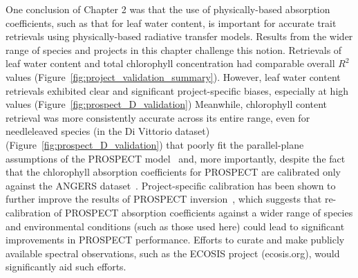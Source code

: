One conclusion of Chapter 2 was that the use of physically-based absorption coefficients, such as that for leaf water content, is important for accurate trait retrievals using physically-based radiative transfer models.
Results from the wider range of species and projects in this chapter challenge this notion.
Retrievals of leaf water content and total chlorophyll concentration had comparable overall $R^2$ values (Figure~\ref{fig:project_validation_summary}).
However, leaf water content retrievals exhibited clear and significant project-specific biases, especially at high values (Figure~\ref{fig:prospect_D_validation})
Meanwhile, chlorophyll content retrieval was more consistently accurate across its entire range, even for needleleaved species (in the Di Vittorio dataset) (Figure~\ref{fig:prospect_D_validation}) that poorly fit the parallel-plane assumptions of the PROSPECT model~\cite{allen_1969_interaction,jacquemoud1990_prospect} and, more importantly, despite the fact that the chlorophyll absorption coefficients for PROSPECT are calibrated only against the ANGERS dataset~\cite{feret2008_prospect,feret2017_prospectd}.
Project-specific calibration has been shown to further improve the results of PROSPECT inversion~\cite{li_2013_retrieval}, which suggests that re-calibration of PROSPECT absorption coefficients against a wider range of species and environmental conditions (such as those used here) could lead to significant improvements in PROSPECT performance.
Efforts to curate and make publicly available spectral observations, such as the ECOSIS project (ecosis.org), would significantly aid such efforts.

